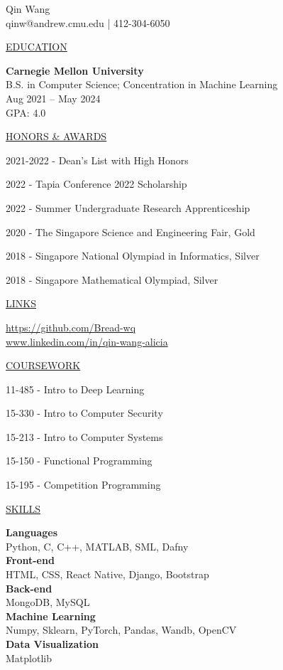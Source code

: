 \documentclass[11pt]{article}
\newcommand{\resumetitle}[3]{
    \AddToShipoutPictureBG{
        \AtPageUpperLeft {
        \raisebox{-0.09\paperheight}{
            \color{black!85}\rule{2\paperwidth}{\paperheight}}
        }}
    \begin{Center}
        \begingroup
        \titlethin
        \color{black!10}\Huge{#1}
        \titlethick
        \color{black!5}\Huge{#2} \\
        \vspace{2mm}
        \textrm{\color{black!15}\Large{#3}}
        \endgroup
    \end{Center}
    \vspace{7mm}
}
\newcommand{\betteruline}[1]{
    \uline{#1}
}
\newcommand{\sectiontitle}[1]{
    \begingroup
        \titlebold
        \betteruline{\Large\uppercase{#1}  }
        \vspace{1.7mm}
    \endgroup
}
\newcommand{\sectioncontent}[1]{
    \begingroup
        \begin{FlushLeft}
        \vspace{-3mm}
        \sffamily\small#1
        \end{FlushLeft}
    \endgroup
    \vspace{2mm}
}
\newcommand{\honor}[2]{
    \textcolor{black!70}{#1} - #2 \\
    \vspace{1.5mm}
}
\begin{document}
    \resumetitle{Qin}{Wang} {
        qinw@andrew.cmu.edu |
        412-304-6050 
    }

    \setlength{\columnsep}{7mm}
    \begin{paracol}{2}

    \sectiontitle{education}
    \sectioncontent{
        \textbf{\normalsize Carnegie Mellon University} \\
        B.S. in Computer Science; Concentration in Machine Learning\\
        \textcolor{black!70}{Aug 2021 – May 2024} \\
        GPA: 4.0
    }


    \sectiontitle{Honors \& Awards}
    \sectioncontent{
        \honor{2021-2022}{Dean's List with High Honors }
        \honor{2022}{Tapia Conference 2022 Scholarship}
        \honor{2022}{Summer Undergraduate Research Apprenticeship}
        \honor{2020}{The Singapore Science and Engineering Fair, Gold}
        \honor{2018}{Singapore National Olympiad in Informatics, Silver}
        \honor{2018}{Singapore Mathematical Olympiad, Silver}
    }
    \sectiontitle{Links}
    \sectioncontent{
        \hspace{2mm}
        \href{https://github.com/Bread-wq}{https://github.com/Bread-wq} \\
        \faIcon{linkedin-in}\hspace{2.1mm} 
        \href{https://www.linkedin.com/in/qin-wang-alicia}{www.linkedin.com/in/qin-wang-alicia} 
    }
      
    \sectiontitle{Coursework}
    \sectioncontent{
         \honor{11-485}{Intro to Deep Learning}
         \honor{15-330}{Intro to Computer Security}
         \honor{15-213}{Intro to Computer Systems}
         \honor{15-150}{Functional Programming}
         \honor{15-195}{Competition Programming}
    }
    \sectiontitle{Skills}
    \sectioncontent{
        \textbf{Languages} \\
        Python, C, C++, MATLAB, SML, Dafny\\
        \textbf{Front-end}\\ HTML, CSS, React Native, Django, Bootstrap\\
        \textbf{Back-end}\\ MongoDB, MySQL\\
        \textbf{Machine Learning}\\ Numpy, Sklearn, PyTorch, Pandas, Wandb, OpenCV\\
        \textbf{Data Visualization}\\
        Matplotlib
    }


\end{paracol}
\end{document}
